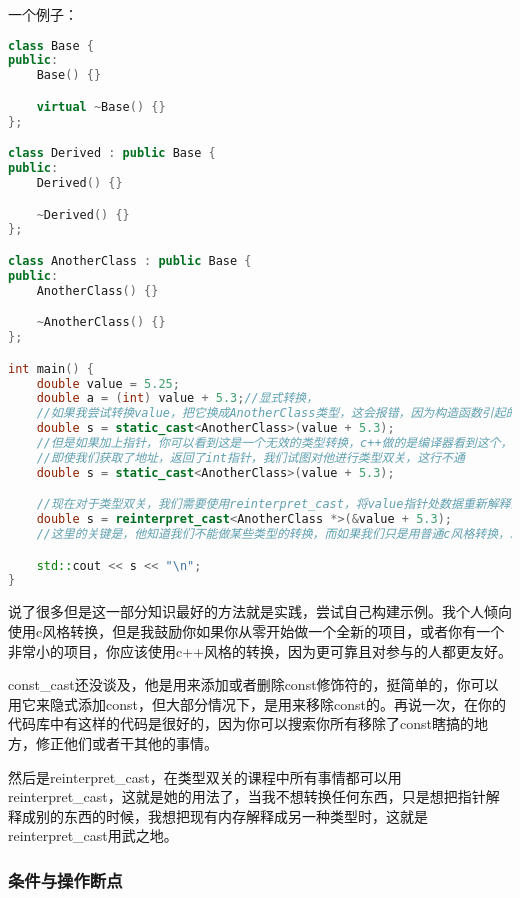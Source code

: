 一个例子：
\begin{lstlisting}[language=c++]
class Base {
public:
    Base() {}

    virtual ~Base() {}
};

class Derived : public Base {
public:
    Derived() {}

    ~Derived() {}
};

class AnotherClass : public Base {
public:
    AnotherClass() {}

    ~AnotherClass() {}
};

int main() {
    double value = 5.25;
    double a = (int) value + 5.3;//显式转换，
    //如果我尝试转换value，把它换成AnotherClass类型，这会报错，因为构造函数引起的
    double s = static_cast<AnotherClass>(value + 5.3);
    //但是如果加上指针，你可以看到这是一个无效的类型转换，c++做的是编译器看到这个，然后认为是行不通的
    //即使我们获取了地址，返回了int指针，我们试图对他进行类型双关，这行不通
    double s = static_cast<AnotherClass>(value + 5.3);

    //现在对于类型双关，我们需要使用reinterpret_cast，将value指针处数据重新解释为AnotherClass实例的数据
    double s = reinterpret_cast<AnotherClass *>(&value + 5.3);
    //这里的关键是，他知道我们不能做某些类型的转换，而如果我们只是用普通c风格转换，就没办法知道了，他默认使用reinterpret_cast的事

    std::cout << s << "\n";
}
\end{lstlisting}

说了很多但是这一部分知识最好的方法就是实践，尝试自己构建示例。我个人倾向使用c风格转换，但是我鼓励你如果你从零开始做一个全新的项目，或者你有一个非常小的项目，你应该使用c++风格的转换，因为更可靠且对参与的人都更友好。

{\ncodestyle const_cast}还没谈及，他是用来添加或者删除{\ncodestyle const}修饰符的，挺简单的，你可以用它来隐式添加{\ncodestyle const}，但大部分情况下，是用来移除{\ncodestyle const}的。再说一次，在你的代码库中有这样的代码是很好的，因为你可以搜索你所有移除了const瞎搞的地方，修正他们或者干其他的事情。

然后是{\ncodestyle reinterpret_cast}，在类型双关的课程中所有事情都可以用{\ncodestyle reinterpret_cast}，这就是她的用法了，当我不想转换任何东西，只是想把指针解释成别的东西的时候，我想把现有内存解释成另一种类型时，这就是{\ncodestyle reinterpret_cast}用武之地。

\subsubsection{条件与操作断点}


